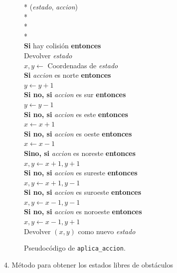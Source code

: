 \documentclass[conference,a4paper]{IEEEtran}
\begin{document}
\begin{figure}[h]
  \begin{pseudo}*
    (\textit{estado}, \textit{accion}) \\*
     \\*
     \\*
    \\
    \textbf{Si} hay colisión \textbf{entonces} \\
    \> Devolver \textit{estado} \\
    $x, y \leftarrow$ Coordenadas de \textit{estado} \\
    \textbf{Si} \textit{accion} es norte \textbf{entonces} \\
    \> $y \leftarrow y + 1$ \\
    \textbf{Si no, si} \textit{accion} es sur \textbf{entonces} \\
    \> $y \leftarrow y - 1$ \\
    \textbf{Si no, si} \textit{accion} es este \textbf{entonces} \\
    \> $x \leftarrow x + 1$ \\
    \textbf{Si no, si} \textit{accion} es oeste \textbf{entonces} \\
    \> $x \leftarrow x - 1$ \\
    \textbf{Sino, si} \textit{accion} es noreste \textbf{entonces} \\
    \> $x, y \leftarrow x + 1, y + 1$ \\
    \textbf{Si no, si} \textit{accion} es sureste \textbf{entonces} \\
    \> $x, y \leftarrow x + 1, y - 1$ \\
    \textbf{Si no, si} \textit{accion} es suroeste \textbf{entonces} \\
    \> $x, y \leftarrow x - 1, y - 1$ \\
    \textbf{Si no, si} \textit{accion} es noroeste \textbf{entonces} \\
    \> $x, y \leftarrow x - 1, y + 1$ \\
    Devolver $(x, y)$ como nuevo \textit{estado}
  \end{pseudo}
  \caption{Pseudocódigo de \texttt{aplica\_accion}.}
  \label{fig:aplica_accion}
\end{figure}

4. Método para obtener los estados libres de obstáculos
\end{document}
